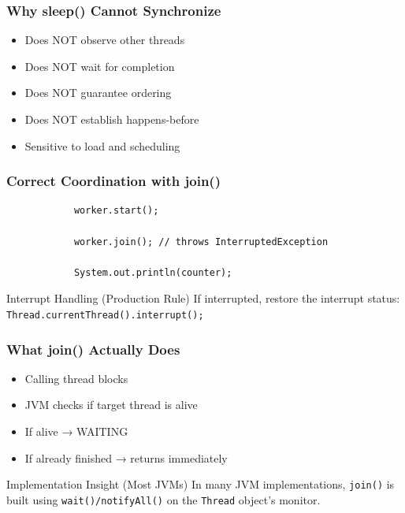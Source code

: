 \documentclass[aspectratio=169,11pt]{beamer}
\begin{document}
	\begin{frame}
		\frametitle{Why sleep() Cannot Synchronize}
		
		\begin{itemize}
			\item Does NOT observe other threads
			\item Does NOT wait for completion
			\item Does NOT guarantee ordering
			\item Does NOT establish happens-before
			\item Sensitive to load and scheduling
		\end{itemize}
		
	\end{frame}
	
	\begin{frame}[fragile]
		\frametitle{Correct Coordination with join()}
		
		\begin{lstlisting}
			worker.start();
			
			worker.join(); // throws InterruptedException
			
			System.out.println(counter);
		\end{lstlisting}
		
		\vspace{4mm}
		
		\begin{block}{Interrupt Handling (Production Rule)}
			If interrupted, restore the interrupt status:
			\texttt{Thread.currentThread().interrupt();}
		\end{block}
		
	\end{frame}
	
	\begin{frame}
		\frametitle{What join() Actually Does}
		
		\begin{itemize}
			\item Calling thread blocks
			\item JVM checks if target thread is alive
			\item If alive → WAITING
			\item If already finished → returns immediately
		\end{itemize}
		
		\vspace{4mm}
		
		\begin{block}{Implementation Insight (Most JVMs)}
			In many JVM implementations, \texttt{join()} is built using
			\texttt{wait()/notifyAll()} on the \texttt{Thread} object's monitor.
		\end{block}
		
	\end{frame}
	
\end{document}
